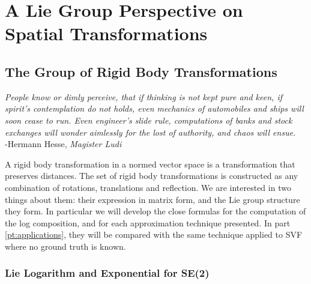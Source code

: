 \chapter{A Lie Group Perspective on Spatial Transformations}\label{ch:spatial_transformations}

\section{The Group of Rigid Body Transformations}\label{ch:rigid_body_transformations}

\begin{flushright}
	\emph{People know or dimly perceive, that if thinking is not kept pure and keen, if spirit's contemplation do not holds, even mechanics of automobiles and ships will soon cease to run. Even engineer's slide rule, computations of banks and stock exchanges will wonder aimlessly for the lost of authority, and chaos will ensue.} \\ -Hermann Hesse, \emph{Magister Ludi}
\end{flushright}


A rigid body transformation in a normed vector space is a transformation that preserves distances. The set of rigid body transformations is constructed as any combination of rotations, translations and reflection. We are interested in two things about them: their expression in matrix form, and the Lie group structure they form. In particular we will develop the close formulas for the computation of the log composition, and for each approximation technique presented. In part \ref{pt:applications}, they will be compared with the same technique applied to SVF where no ground truth is known.

\subsection{Lie Logarithm and Exponential for SE(2)}

